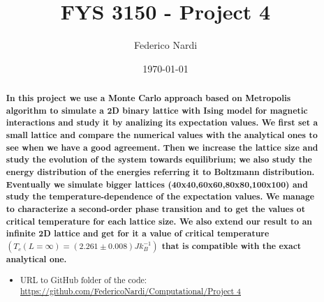 \documentclass[%
 reprint,
 amsmath,amssymb,
 aps,
]{revtex4-1}
\theoremstyle{plain}
\theoremstyle{definition}
\theoremstyle{plain}
\begin{document}

\title{FYS 3150 - Project 4}%

\author{Federico Nardi}


\date{\today}%

\begin{abstract}
\textbf{In this project we use a Monte Carlo approach based on Metropolis algorithm to simulate a 2D binary lattice with Ising model for magnetic interactions and study it by analizing its expectation values. We first set a small lattice and compare the numerical values with the analytical ones to see when we have a good agreement. Then we increase the lattice size and study the evolution of the system towards equilibrium; we also study the energy distribution of the energies referring it to Boltzmann distribution. Eventually we simulate bigger lattices (40x40,60x60,80x80,100x100) and study the temperature-dependence of the expectation values. We manage to characterize a second-order phase transition and to get the values ot critical temperature for each lattice size. We also extend our result to an infinite 2D lattice and get for it a value of critical temperature $(T_c(L=\infty) = (2.261\pm0.008)Jk_B^{-1})$ that is compatible with the exact analytical one.}


\begin{itemize}
\item URL to GitHub folder of the code: \url{https://github.com/FedericoNardi/Computational/Project 4}
\end{itemize}
\end{abstract}
\end{document}
